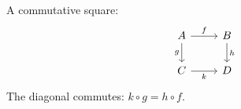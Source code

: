 \documentclass{article}
\begin{document}
A commutative square:
\[
\begin{tikzcd}
A \arrow[r, "f"] \arrow[d, "g"'] & B \arrow[d, "h"] \\
C \arrow[r, "k"'] & D
\end{tikzcd}
\]
The diagonal commutes: $k \circ g = h \circ f$.
\end{document}
